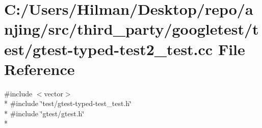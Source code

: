 \hypertarget{gtest-typed-test2__test_8cc}{}\section{C\+:/\+Users/\+Hilman/\+Desktop/repo/anjing/src/third\+\_\+party/googletest/test/gtest-\/typed-\/test2\+\_\+test.cc File Reference}
\label{gtest-typed-test2__test_8cc}
{\ttfamily \#include $<$vector$>$}\\*
{\ttfamily \#include \char`\"{}test/gtest-\/typed-\/test\+\_\+test.\+h\char`\"{}}\\*
{\ttfamily \#include \char`\"{}gtest/gtest.\+h\char`\"{}}\\*
